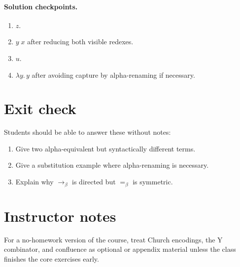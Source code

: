 \documentclass[11pt]{article}
\newcommand{\lam}[1]{\lambda #1.\,}
\newcommand{\onereduce}{\to_\beta}
\begin{document}
\paragraph{Solution checkpoints.}
\begin{enumerate}[nosep]
  \item $z$.
  \item $y\;x$ after reducing both visible redexes.
  \item $u$.
  \item $\lam{y}y$ after avoiding capture by alpha-renaming if necessary.
\end{enumerate}

\section*{Exit check}
Students should be able to answer these without notes:
\begin{enumerate}[nosep]
  \item Give two alpha-equivalent but syntactically different terms.
  \item Give a substitution example where alpha-renaming is necessary.
  \item Explain why $\onereduce$ is directed but $=_\beta$ is symmetric.
\end{enumerate}

\section*{Instructor notes}
For a no-homework version of the course, treat Church encodings, the Y combinator, and confluence as optional or appendix material unless the class finishes the core exercises early.
\end{document}
